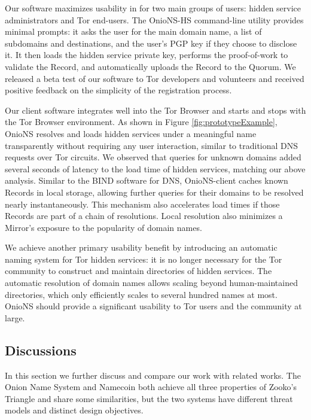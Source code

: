 \documentclass[USenglish,oneside,twocolumn]{article}
\begin{document}
Our software maximizes usability in for two main groups of users: hidden service administrators and Tor end-users. The OnioNS-HS command-line utility provides minimal prompts: it asks the user for the main domain name, a list of subdomains and destinations, and the user's PGP key if they choose to disclose it. It then loads the hidden service private key, performs the proof-of-work to validate the Record, and automatically uploads the Record to the Quorum. We released a beta test of our software to Tor developers and volunteers and received positive feedback on the simplicity of the registration process.

Our client software integrates well into the Tor Browser and starts and stops with the Tor Browser environment. As shown in Figure \ref{fig:prototypeExample}, OnioNS resolves and loads hidden services under a meaningful name transparently without requiring any user interaction, similar to traditional DNS requests over Tor circuits. We observed that queries for unknown domains added several seconds of latency to the load time of hidden services, matching our above analysis. Similar to the BIND software for DNS, OnioNS-client caches known Records in local storage, allowing further queries for their domains to be resolved nearly instantaneously. This mechanism also accelerates load times if those Records are part of a chain of resolutions. Local resolution also minimizes a Mirror's exposure to the popularity of domain names.


We achieve another primary usability benefit by introducing an automatic naming system for Tor hidden services: it is no longer necessary for the Tor community to construct and maintain directories of hidden services. The automatic resolution of domain names allows scaling beyond human-maintained directories, which only efficiently scales to several hundred names at most. OnioNS should provide a significant usability to Tor users and the community at large.

\subsection{Discussions}

In this section we further discuss and compare our work with related works. The Onion Name System and Namecoin both achieve all three properties of Zooko's Triangle and share some similarities, but the two systems have different threat models and distinct design objectives.
\end{document}
